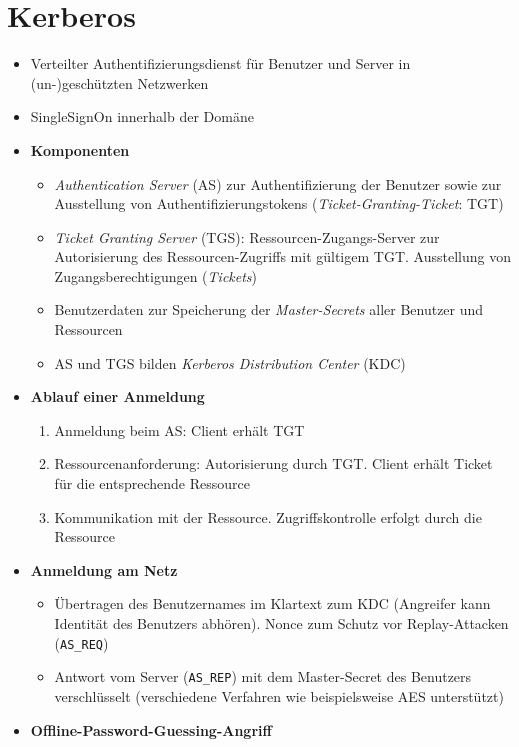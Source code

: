 \section{Kerberos}
\begin{itemize}
	\item Verteilter Authentifizierungsdienst für Benutzer und Server in (un-)geschützten Netzwerken
	\item SingleSignOn innerhalb der Domäne
	\item \textbf{Komponenten}
	\begin{itemize}
		\item \textit{Authentication Server} (AS) zur Authentifizierung der Benutzer sowie zur Ausstellung von Authentifizierungstokens (\textit{Ticket-Granting-Ticket}: TGT)
		\item \textit{Ticket Granting Server} (TGS): Ressourcen-Zugangs-Server zur Autorisierung des Ressourcen-Zugriffs mit gültigem TGT. Ausstellung von Zugangsberechtigungen (\textit{Tickets})
		\item Benutzerdaten zur Speicherung der \textit{Master-Secrets} aller Benutzer und Ressourcen
		\item AS und TGS bilden \textit{Kerberos Distribution Center} (KDC)
	\end{itemize}
	\item \textbf{Ablauf einer Anmeldung}
	\begin{enumerate}
		\item Anmeldung beim AS: Client erhält TGT
		\item Ressourcenanforderung: Autorisierung durch TGT. Client erhält Ticket für die entsprechende Ressource
		\item Kommunikation mit der Ressource. Zugriffskontrolle erfolgt durch die Ressource
	\end{enumerate}
	\item \textbf{Anmeldung am Netz}
	\begin{itemize}
		\item Übertragen des Benutzernames im Klartext zum KDC (Angreifer kann Identität des Benutzers abhören). Nonce zum Schutz vor Replay-Attacken (\texttt{AS\_REQ})
		\item Antwort vom Server (\texttt{AS\_REP}) mit dem Master-Secret des Benutzers verschlüsselt (verschiedene Verfahren wie beispielsweise AES unterstützt)
	\end{itemize}
	\item \textbf{Offline-Password-Guessing-Angriff}
	\begin{itemize}

\end{itemize}
\end{itemize}
